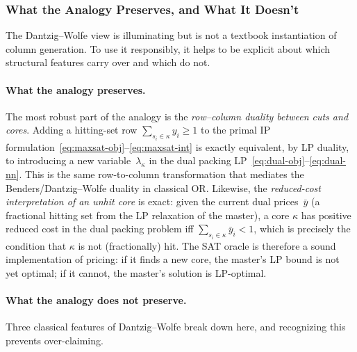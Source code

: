 \subsubsection{What the Analogy Preserves, and What It Doesn't}
\label{sec:preserves}

The Dantzig--Wolfe view is illuminating but is not a textbook instantiation
of column generation. To use it responsibly, it helps to be explicit about
which structural features carry over and which do not.

\paragraph{What the analogy preserves.} The most robust part of the analogy
is the \emph{row--column duality between cuts and cores}. Adding a hitting-set
row $\sum_{s_i \in \kappa} y_i \geq 1$ to the primal IP
formulation~\eqref{eq:maxsat-obj}--\eqref{eq:maxsat-int} is exactly equivalent,
by LP duality, to introducing a new variable~$\lambda_\kappa$ in the dual
packing LP~\eqref{eq:dual-obj}--\eqref{eq:dual-nn}. This is the same
row-to-column transformation that mediates the Benders/Dantzig--Wolfe duality
in classical OR. Likewise, the \emph{reduced-cost interpretation of an unhit
core} is exact: given the current dual prices~$\bar{y}$ (a fractional hitting
set from the LP relaxation of the master), a core $\kappa$ has positive
reduced cost in the dual packing problem iff
$\sum_{s_i \in \kappa} \bar{y}_i < 1$, which is precisely the condition that
$\kappa$ is not (fractionally) hit. The SAT oracle is therefore a sound
implementation of pricing: if it finds a new core, the master's LP bound is
not yet optimal; if it cannot, the master's solution is LP-optimal.

\paragraph{What the analogy does not preserve.} Three classical features of
Dantzig--Wolfe break down here, and recognizing this prevents over-claiming.

